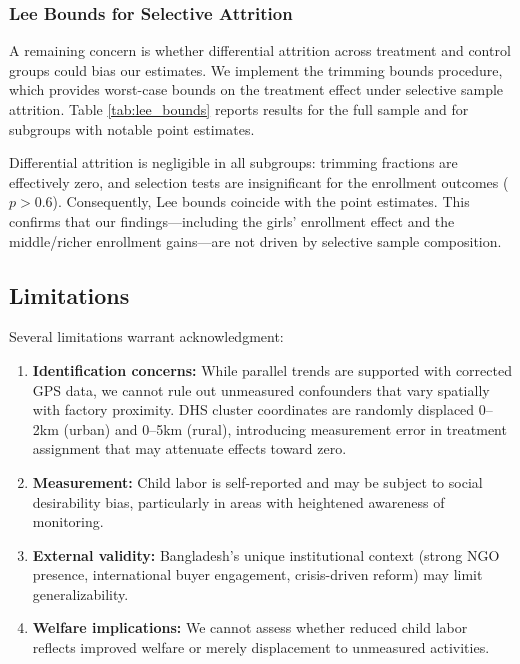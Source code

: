 \documentclass[12pt]{article}
\begin{document}
\subsubsection{Lee Bounds for Selective Attrition}

A remaining concern is whether differential attrition across treatment and control groups could bias our estimates. We implement the \citet{lee2009training} trimming bounds procedure, which provides worst-case bounds on the treatment effect under selective sample attrition. Table \ref{tab:lee_bounds} reports results for the full sample and for subgroups with notable point estimates.



Differential attrition is negligible in all subgroups: trimming fractions are effectively zero, and selection tests are insignificant for the enrollment outcomes ($p > 0.6$). Consequently, Lee bounds coincide with the point estimates. This confirms that our findings---including the girls' enrollment effect and the middle/richer enrollment gains---are not driven by selective sample composition.

\subsection{Limitations}

Several limitations warrant acknowledgment:

\begin{enumerate}
\item \textbf{Identification concerns:} While parallel trends are supported with corrected GPS data, we cannot rule out unmeasured confounders that vary spatially with factory proximity. DHS cluster coordinates are randomly displaced 0--2km (urban) and 0--5km (rural), introducing measurement error in treatment assignment that may attenuate effects toward zero.

\item \textbf{Measurement:} Child labor is self-reported and may be subject to social desirability bias, particularly in areas with heightened awareness of monitoring.

\item \textbf{External validity:} Bangladesh's unique institutional context (strong NGO presence, international buyer engagement, crisis-driven reform) may limit generalizability.

\item \textbf{Welfare implications:} We cannot assess whether reduced child labor reflects improved welfare or merely displacement to unmeasured activities.
\end{enumerate}
\end{document}
